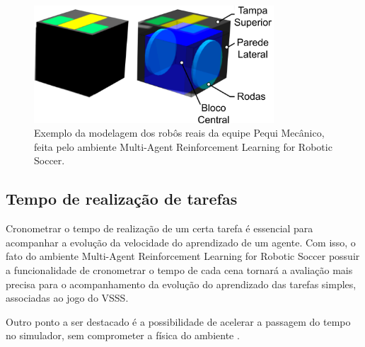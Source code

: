     \begin{figure}[H]
     \centering
     \includegraphics[width=0.8\textwidth]{./fig/model_robo.png}
    
     \caption{Exemplo da modelagem dos robôs reais da equipe Pequi Mecânico, feita pelo ambiente Multi-Agent Reinforcement Learning for Robotic Soccer.}
     \label{fig:model_robo}
    \end{figure}


\subsection*{Tempo de realização de tarefas }

Cronometrar o tempo de realização de um certa tarefa é essencial para acompanhar a evolução da velocidade do aprendizado de um agente. Com isso, o fato do ambiente  Multi-Agent Reinforcement Learning for Robotic Soccer possuir a funcionalidade de cronometrar o tempo de cada cena tornará a avaliação mais precisa para o acompanhamento da evolução do aprendizado das tarefas simples, associadas ao jogo do VSSS.

Outro ponto a ser destacado é a possibilidade de acelerar a passagem do tempo no simulador, sem comprometer a física do ambiente \cite{bruno_brandao}.





